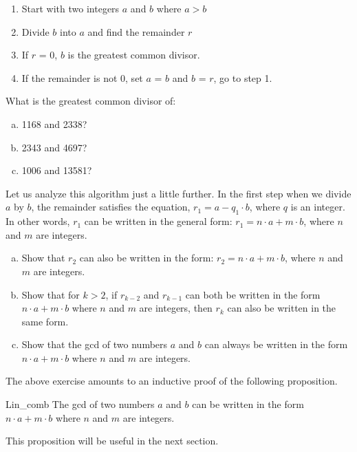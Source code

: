 \begin{enumerate}[1:]
\item
Start with two integers $a$ and $b$ where $a > b$
\item
Divide $b$ into $a$ and find the remainder $r$
\item
If $r$ = 0, $b$ is the greatest common divisor.
\item
If the remainder is not 0, set $a$ = $b$ and $b$ = $r$, go to step 1.
\end{enumerate}


\begin{exercise}{}
What is the greatest common divisor of:
\begin{enumerate}[(a)]
\item
1168 and 2338?
\item
2343 and 4697?
\item
1006 and 13581?
\end{enumerate}
\end{exercise} 

Let us analyze this algorithm just a little further.  In the first step when we divide $a$ by $b$, the remainder satisfies the equation,  $r_1 = a - q_1\cdot b$, where $q$ is an integer.  In other words, $r_1$ can be written in the general form:  $r_1 = n \cdot a + m \cdot b$, where $n$ and $m$ are integers.

\begin{exercise}{71}
\begin{enumerate}[(a)]
\item  
Show that $r_2$ can also be written in the form: $r_2 = n \cdot a + m \cdot b$, where $n$ and $m$ are integers.
\item
Show that for $k>2$, if $r_{k-2}$ and $r_{k-1}$ can both be written in the form  $n \cdot a + m \cdot b$ where $n$ and $m$ are integers, then $r_k$ can also be written in the same form.
\item
Show that the gcd of two numbers $a$ and $b$ can always be written in the form $n \cdot a + m \cdot b$ where $n$ and $m$ are integers.
\end{enumerate}
\end{exercise}

The above exercise amounts to an inductive proof of the following proposition.

\begin{prop}{Lin_comb}
The gcd of two numbers $a$ and $b$ can be written in the form $n \cdot a + m \cdot b$ where $n$ and $m$ are integers.
\end{prop}
\noindent
This proposition will be useful in the next section.

